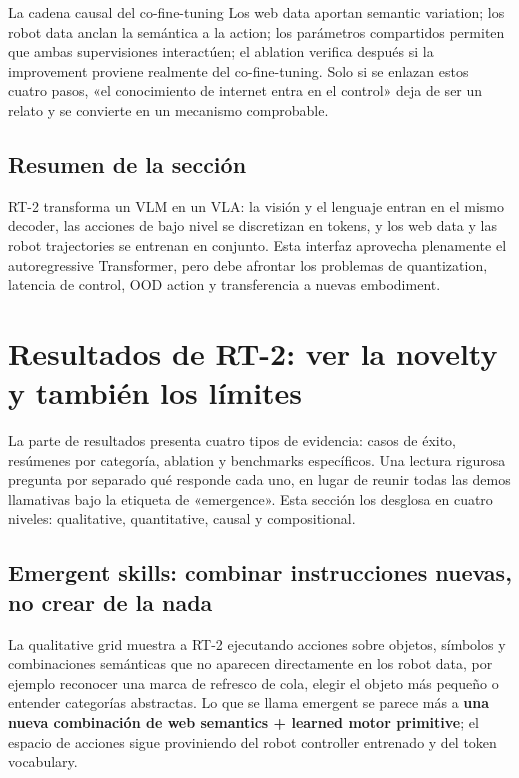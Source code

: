 \documentclass[a4paper]{article}
\begin{document}
\begin{importantbox}{La cadena causal del co-fine-tuning}
Los web data aportan semantic variation; los robot data anclan la semántica a la action; los parámetros compartidos permiten que ambas supervisiones interactúen; el ablation verifica después si la improvement proviene realmente del co-fine-tuning. Solo si se enlazan estos cuatro pasos, «el conocimiento de internet entra en el control» deja de ser un relato y se convierte en un mecanismo comprobable.
\end{importantbox}

\subsection{Resumen de la sección}

RT-2 transforma un VLM en un VLA: la visión y el lenguaje entran en el mismo decoder, las acciones de bajo nivel se discretizan en tokens, y los web data y las robot trajectories se entrenan en conjunto. Esta interfaz aprovecha plenamente el autoregressive Transformer, pero debe afrontar los problemas de quantization, latencia de control, OOD action y transferencia a nuevas embodiment.
\section{Resultados de RT-2: ver la novelty y también los límites}

La parte de resultados presenta cuatro tipos de evidencia: casos de éxito, resúmenes por categoría, ablation y benchmarks específicos. Una lectura rigurosa pregunta por separado qué responde cada uno, en lugar de reunir todas las demos llamativas bajo la etiqueta de «emergence». Esta sección los desglosa en cuatro niveles: qualitative, quantitative, causal y compositional.

\subsection{Emergent skills: combinar instrucciones nuevas, no crear de la nada}

La qualitative grid muestra a RT-2 ejecutando acciones sobre objetos, símbolos y combinaciones semánticas que no aparecen directamente en los robot data, por ejemplo reconocer una marca de refresco de cola, elegir el objeto más pequeño o entender categorías abstractas. Lo que se llama emergent se parece más a \textbf{una nueva combinación de web semantics + learned motor primitive}; el espacio de acciones sigue proviniendo del robot controller entrenado y del token vocabulary.
\end{document}
